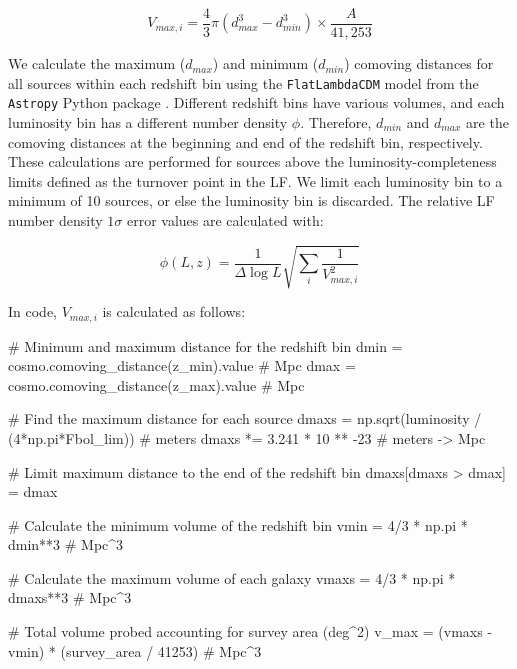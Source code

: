\begin{equation}
    \label{EQ: Vmax}
    V_{max,i} = \frac{4}{3} \pi \left(d_{max}^3 - d_{min}^3\right) \times \frac{A}{41,253}
\end{equation}


We calculate the maximum ($d_{max}$) and minimum ($d_{min}$) comoving distances for all sources within each redshift bin using the \texttt{FlatLambdaCDM} model from the \texttt{Astropy} Python package \citep{astropy_collaboration_astropy_2022}. Different redshift bins have various volumes, and each luminosity bin has a different number density $\phi$. Therefore, $d_{min}$ and $d_{max}$ are the comoving distances at the beginning and end of the redshift bin, respectively. These calculations are performed for sources above the luminosity-completeness limits defined as the turnover point in the LF. We limit each luminosity bin to a minimum of 10 sources, or else the luminosity bin is discarded. The relative LF number density $1\sigma$ error values are calculated with:

\begin{equation} 
    \label{EQ: Number Density Error}
    \phi(L,z) = \frac{1}{\Delta \log L}\sqrt{\sum_i \frac{1}{V_{max,i}^2}}
\end{equation}

In code, $V_{max,i}$ is calculated as follows:

\begin{python}    
    # Minimum and maximum distance for the redshift bin
    dmin = cosmo.comoving_distance(z_min).value # Mpc
    dmax = cosmo.comoving_distance(z_max).value # Mpc

    # Find the maximum distance for each source
    dmaxs = np.sqrt(luminosity / (4*np.pi*Fbol_lim)) # meters
    dmaxs *= 3.241 * 10 ** -23 # meters -> Mpc

    # Limit maximum distance to the end of the redshift bin
    dmaxs[dmaxs > dmax] = dmax

    # Calculate the minimum volume of the redshift bin
    vmin = 4/3 * np.pi * dmin**3 # Mpc^3

    # Calculate the maximum volume of each galaxy
    vmaxs = 4/3 * np.pi * dmaxs**3 # Mpc^3
    
    # Total volume probed accounting for survey area (deg^2)
    v_max = (vmaxs - vmin) * (survey_area / 41253) # Mpc^3
\end{python}

